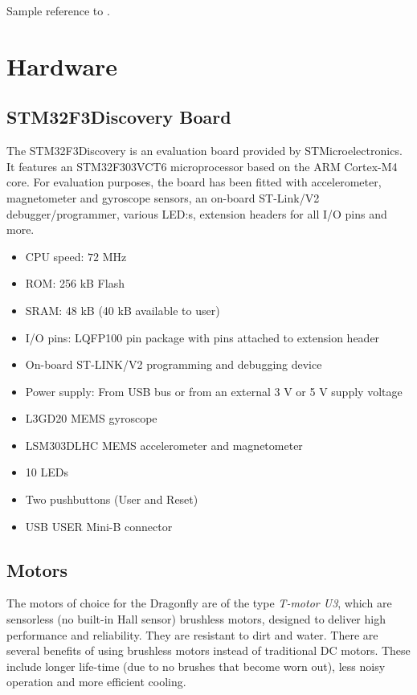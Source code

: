 \documentclass[a4paper]{article}
\begin{document}
Sample reference to \cite{stenberg}.

\section{Hardware}

\subsection{STM32F3Discovery Board}
The STM32F3Discovery is an evaluation board provided by STMicroelectronics. It features an STM32F303VCT6 microprocessor based on the ARM Cortex-M4 core. For evaluation purposes, the board has been fitted with accelerometer, magnetometer and gyroscope sensors, an on-board ST-Link/V2 debugger/programmer, various LED:s, extension headers for all I/O pins and more.

\begin{itemize}
  \item CPU speed: $72$ MHz
  \item ROM: 256 kB Flash
  \item SRAM: 48 kB (40 kB available to user)
  \item I/O pins: LQFP100 pin package with pins attached to extension header
  \item On-board ST-LINK/V2 programming and debugging device
  \item Power supply: From USB bus or from an external 3 V or 5 V supply voltage
  \item L3GD20 MEMS gyroscope
  \item LSM303DLHC MEMS accelerometer and magnetometer
  \item 10 LEDs
  \item Two pushbuttons (User and Reset)
  \item USB USER Mini-B connector
\end{itemize}

\subsection{Motors}
The motors of choice for the Dragonfly are of the type \emph{T-motor U3}, which are sensorless (no built-in Hall sensor) brushless motors, designed to deliver high performance and reliability. They are resistant to dirt and water. There are several benefits of using brushless motors instead of traditional DC motors. These include longer life-time (due to no brushes that become worn out), less noisy operation and more efficient cooling.
\end{document}
